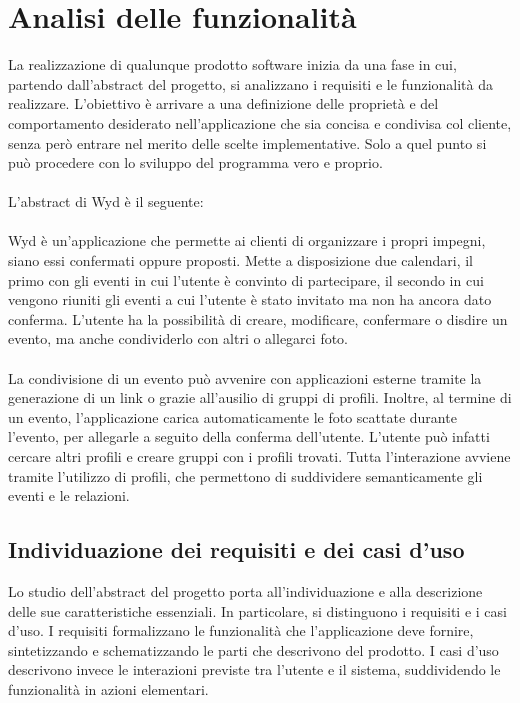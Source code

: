 \chapter{Analisi delle funzionalità}

La realizzazione di qualunque prodotto software inizia da una fase in cui,
partendo dall’abstract del progetto, si analizzano i requisiti e le funzionalità da realizzare.
L’obiettivo è arrivare a una definizione delle proprietà e
del comportamento desiderato nell’applicazione che sia concisa e condivisa col cliente,
senza però entrare nel merito delle scelte implementative.
Solo a quel punto si può procedere con lo sviluppo del programma vero e proprio.\\
\\
L'abstract di Wyd è il seguente:\\
\\
Wyd è un'applicazione che permette ai clienti di organizzare i propri impegni,
siano essi confermati oppure proposti.
Mette a disposizione due calendari,
il primo con gli eventi in cui l'utente è convinto di partecipare,
il secondo in cui vengono riuniti gli eventi a cui l'utente è stato invitato ma non ha ancora dato conferma.
L'utente ha la possibilità di creare, modificare, confermare o disdire un evento,
ma anche condividerlo con altri o allegarci foto.\\
\\
La condivisione di un evento può avvenire con applicazioni esterne tramite la generazione di un link o
grazie all'ausilio di gruppi di profili.
Inoltre, al termine di un evento, l'applicazione carica automaticamente le foto scattate
durante l'evento, per allegarle a seguito della conferma dell'utente.
L'utente può infatti cercare altri profili e creare gruppi con i profili trovati.
Tutta l'interazione avviene tramite l'utilizzo di profili,
che permettono di suddividere semanticamente gli eventi e le relazioni.
\clearpage

\section{Individuazione dei requisiti e dei casi d’uso}

Lo studio dell’abstract del progetto porta all’individuazione e
alla descrizione delle sue caratteristiche essenziali.
In particolare, si distinguono i requisiti e i casi d'uso.
I requisiti formalizzano le funzionalità che l'applicazione deve fornire,
sintetizzando e schematizzando le parti che descrivono del prodotto.
I casi d'uso descrivono invece le interazioni previste tra l'utente e il sistema,
suddividendo le funzionalità in azioni elementari.
